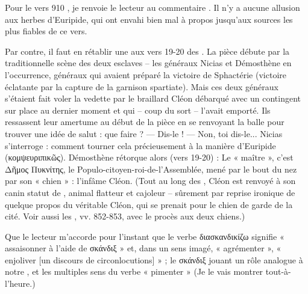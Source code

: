 {Pour le vers 910 , je renvoie le lecteur au commentaire . 
Il n'y a aucune allusion aux herbes d'Euripide, qui ont envahi bien mal à propos jusqu'aux sources les plus fiables de ce vers.

Par contre, il faut en rétablir une aux vers 19-20 des . La pièce débute par la traditionnelle scène des deux esclaves -- les généraux Nicias et Démosthène en l'occurrence, généraux qui avaient préparé la victoire de Sphactérie (victoire éclatante par la capture de la garnison spartiate). 
Mais ces deux généraux s'étaient fait voler la vedette par le braillard Cléon débarqué avec un contingent sur place au dernier moment et qui – coup du sort – l'avait emporté. Ils ressassent leur amertume au début de la pièce en se renvoyant la balle pour trouver une idée de salut : que faire ? — Dis-le ! — Non, toi dis-le... Nicias s'interroge : comment tourner cela précieusement à la manière d'Euripide (κομψευριπικῶς). Démosthène rétorque alors (vers 19-20) :
Le « maître », c'est Δῆμος Πυκνίτης, le Populo-citoyen-roi-de-l'Assemblée, mené par le bout du nez par son « chien » : l'infâme Cléon. 
(Tout au long des , Cléon est renvoyé à son canin statut de , animal flatteur et cajoleur – sûrement par reprise ironique de quelque propos du véritable Cléon, qui se prenait pour le chien de garde de la cité. Voir aussi les , vv. 852-853, avec le procès aux deux chiens.)


Que le lecteur m'accorde pour l'instant que le verbe διασκανδικίζω signifie « assaisonner à l'aide de σκάνδιξ » et, dans un sens imagé, « agrémenter », « enjoliver [un discours de circonlocutions] » ; le σκάνδιξ jouant un rôle analogue à notre , et les multiples sens du verbe « pimenter » (Je le vais montrer tout-à-l'heure.)

}
